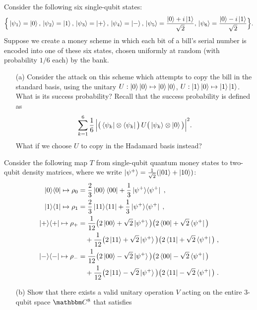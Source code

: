 \documentclass[12pt]{article}
\begin{document}
\begin{enumerate}
Consider the following six single-qubit states:
$$ \Big\{\ket{\psi_1} = \ket{0},\, \ket{\psi_2}=\ket{1},\,\ket{\psi_3}=\ket{+},\,\ket{\psi_4}=\ket{-},\,\ket{\psi_5}=\frac{\ket{0}+i\ket{1}}{\sqrt{2}},\,\ket{\psi_6}=\frac{\ket{0}-i\ket{1}}{\sqrt{2}} \Big\}.$$
Suppose we create a money scheme in which each bit of a bill's serial number is encoded into one of these six states, chosen uniformly at random (with probability $1/6$ each) by the bank. 
\begin{enumerate}
\item[(a)] Consider the attack on this scheme which attempts to copy the bill in the standard basis, using the unitary $U:\ket{0}\ket{0}\mapsto \ket{0}\ket{0}$, $U:\ket{1}\ket{0}\mapsto \ket{1}\ket{1}$. What is its success probability? Recall that the success probability is defined as 
$$\sum_{k=1}^6 \frac{1}{6}\,\Big| \big( \bra{\psi_k}\otimes \bra{\psi_k}\big)\, U \big(\ket{\psi_k} \otimes \ket{0}\big)\Big|^2 .$$
What if we choose $U$ to copy in the Hadamard basis instead? 
\end{enumerate}
Consider the following map $T$ from single-qubit quantum money states to two-qubit density matrices, where we write $\ket{\psi^+} = \frac{1}{\sqrt{2}}(\ket{01}+\ket{10})$:
\begin{align*}
\ket{0}\!\bra{0} \mapsto \rho_0 &= \frac{2}{3} \ket{00}\bra{00} + \frac{1}{3} \ket{\psi^+}\!\bra{\psi^+} \;,\\
\ket{1}\!\bra{1} \mapsto \rho_1 &= \frac{2}{3} \ket{11}\!\bra{11} + \frac{1}{3} \ket{\psi^+}\!\bra{\psi^+} \;,\\
\ket{+}\!\bra{+} \mapsto \rho_+ &= \frac{1}{12} \big( 2\ket{00}+ \sqrt{2}\ket{\psi^+} \big)\big( 2\bra{00}+ \sqrt{2}\bra{\psi^+} \big) \\
&\quad+ \frac{1}{12} \big( 2\ket{11}+ \sqrt{2}\ket{\psi^+} \big)\big( 2\bra{11}+\sqrt{2} \bra{\psi^+} \big)\;,\\
\ket{-}\!\bra{-} \mapsto \rho_- &= \frac{1}{12} \big( 2\ket{00}-\sqrt{2}\ket{\psi^+} \big)\big( 2\bra{00}- \sqrt{2}\bra{\psi^+} \big) \\
&\quad+ \frac{1}{12} \big( 2\ket{11}- \sqrt{2}\ket{\psi^+} \big)\big( 2\bra{11}-\sqrt{2} \bra{\psi^+} \big)\;.
\end{align*}
\begin{enumerate}
\item[(b)] Show that there exists a valid unitary operation $V$ acting on the entire $3$-qubit space $\C^8$ that satisfies 

\end{enumerate}
\end{enumerate}
\end{document}

